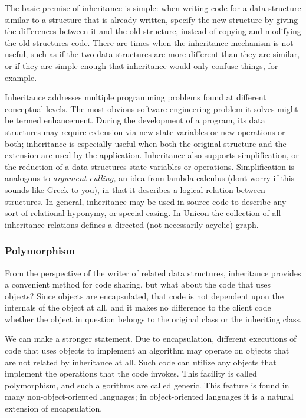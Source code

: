 The basic premise of inheritance is simple: when writing code for a data
structure similar to a structure that is already written,
specify the new structure by giving the differences between it and
the old structure, instead of copying and modifying the old
structure{\textquotesingle}s code. There are times when the
inheritance mechanism is not useful, such as if the two data structures
are more different than they are similar, or if they are simple enough
that inheritance would only confuse things, for example. 

Inheritance addresses multiple programming problems found at
different conceptual levels. The most obvious software engineering
problem it solves might be termed enhancement. During the development
of a program, its data structures may require extension via new state
variables or new operations or both; inheritance is especially useful
when both the original structure and the extension are used by the
application. Inheritance also supports simplification, or the reduction
of a data structure{\textquotesingle}s state variables or operations.
Simplification is analogous to \textit{argument
culling}\textit{,} an idea from lambda calculus (don{\textquotesingle}t
worry if this sounds like Greek to you), in that it describes a logical
relation between structures. In general, inheritance may be used in
source code to describe any sort of relational hyponymy, or special
casing. In Unicon the collection of all inheritance relations defines a
directed (not necessarily acyclic) graph. 

\subsubsection[Polymorphism]{Polymorphism}
From the perspective of the writer of related data
structures, inheritance provides a convenient method for code sharing,
but what about the code that uses objects? Since objects are
encapsulated, that code is not dependent upon the internals of the
object at all, and it makes no difference to the client code whether
the object in question belongs to the original class or the inheriting
class. 

We can make a stronger statement. Due to encapsulation,
different executions of code that uses objects to implement an
algorithm may operate on objects that are not
related by inheritance at all. Such code can utilize any objects that
implement the operations that the code invokes. This facility is called
polymorphism, and such algorithms are called generic. This feature is
found in many non-object-oriented languages; in object-oriented
languages it is a natural extension of encapsulation. 

